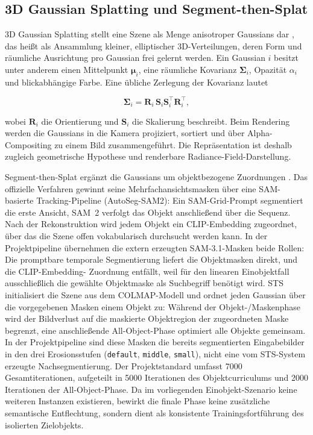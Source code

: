 \subsection{3D Gaussian Splatting und Segment-then-Splat}

3D Gaussian Splatting stellt eine Szene als Menge anisotroper Gaussians dar
\parencite{kerbl2023gaussian}, das heißt als Ansammlung kleiner, elliptischer
3D-Verteilungen, deren Form und räumliche Ausrichtung pro Gaussian frei
gelernt werden. Ein Gaussian $i$ besitzt unter anderem einen
Mittelpunkt $\boldsymbol{\mu}_i$, eine räumliche Kovarianz
$\boldsymbol{\Sigma}_i$, Opazität $\alpha_i$ und blickabhängige Farbe. Eine
übliche Zerlegung der Kovarianz lautet

\begin{equation}
	\boldsymbol{\Sigma}_i =
	\mathbf{R}_i\,\mathbf{S}_i\mathbf{S}_i^{\top}\mathbf{R}_i^{\top},
	\label{eq:gaussian-covariance}
\end{equation}

wobei $\mathbf{R}_i$ die Orientierung und $\mathbf{S}_i$ die Skalierung
beschreibt. Beim Rendering werden die Gaussians in die Kamera projiziert,
sortiert und über Alpha-Compositing zu einem Bild zusammengeführt. Die
Repräsentation ist deshalb zugleich geometrische Hypothese und renderbare
Radiance-Field-Darstellung.

Segment-then-Splat ergänzt die Gaussians um objektbezogene Zuordnungen
\parencite{lu2025segment}. Das offizielle Verfahren gewinnt seine
Mehrfachansichtsmasken über eine SAM-basierte Tracking-Pipeline
(AutoSeg-SAM2): Ein SAM-Grid-Prompt segmentiert die erste Ansicht, SAM~2
verfolgt das Objekt anschließend über die Sequenz. Nach der Rekonstruktion
wird jedem Objekt ein CLIP-Embedding zugeordnet, über das die Szene offen
vokabularisch durchsucht werden kann. In der Projektpipeline übernehmen die
extern erzeugten SAM-3.1-Masken beide Rollen: Die promptbare temporale
Segmentierung liefert die Objektmasken direkt, und die CLIP-Embedding-
Zuordnung entfällt, weil für den linearen Einobjektfall ausschließlich die
gewählte Objektmaske als Suchbegriff benötigt wird. STS initialisiert die
Szene aus dem COLMAP-Modell und ordnet jeden Gaussian über die vorgegebenen
Masken einem Objekt zu: Während der Objekt-/Maskenphase wird der Bildverlust
auf die maskierte Objektregion der zugeordneten Maske begrenzt, eine
anschließende All-Object-Phase optimiert alle Objekte gemeinsam. In der
Projektpipeline sind diese Masken die bereits segmentierten Eingabebilder in
den drei Erosionsstufen (\texttt{default}, \texttt{middle}, \texttt{small}),
nicht eine vom STS-System erzeugte Nachsegmentierung. Der Projektstandard
umfasst 7000 Gesamtiterationen, aufgeteilt in 5000 Iterationen des
Objektcurriculums und 2000 Iterationen der All-Object-Phase. Da im vorliegenden
Einobjekt-Szenario keine weiteren Instanzen existieren, bewirkt die finale
Phase keine zusätzliche semantische Entflechtung, sondern dient als konsistente
Trainingsfortführung des isolierten Zielobjekts.

